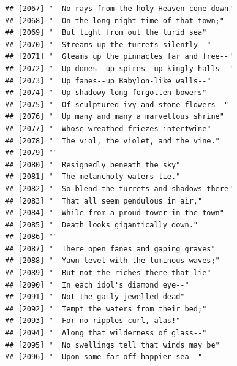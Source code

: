 \documentclass{article}\usepackage[]{graphicx}\usepackage[]{color}
\makeatletter
\newenvironment{kframe}{%
 \def\at@end@of@kframe{}%
 \ifinner\ifhmode%
  \def\at@end@of@kframe{\end{minipage}}%
  \begin{minipage}{\columnwidth}%
 \fi\fi%
 \def\FrameCommand##1{\hskip\@totalleftmargin \hskip-\fboxsep
 \colorbox{shadecolor}{##1}\hskip-\fboxsep
     \hskip-\linewidth \hskip-\@totalleftmargin \hskip\columnwidth}%
 \MakeFramed {\advance\hsize-\width
   \@totalleftmargin\z@ \linewidth\hsize
   \@setminipage}}%
 {\par\unskip\endMakeFramed%
 \at@end@of@kframe}
\newenvironment{knitrout}{}{} %
\makeatother
\begin{document}
\begin{knitrout}
\begin{kframe}
\begin{verbatim}
## [2067] "  No rays from the holy Heaven come down"                                    
## [2068] "  On the long night-time of that town;"                                      
## [2069] "  But light from out the lurid sea"                                          
## [2070] "  Streams up the turrets silently--"                                         
## [2071] "  Gleams up the pinnacles far and free--"                                    
## [2072] "  Up domes--up spires--up kingly halls--"                                    
## [2073] "  Up fanes--up Babylon-like walls--"                                         
## [2074] "  Up shadowy long-forgotten bowers"                                          
## [2075] "  Of sculptured ivy and stone flowers--"                                     
## [2076] "  Up many and many a marvellous shrine"                                      
## [2077] "  Whose wreathed friezes intertwine"                                         
## [2078] "  The viol, the violet, and the vine."                                       
## [2079] ""                                                                            
## [2080] "  Resignedly beneath the sky"                                                
## [2081] "  The melancholy waters lie."                                                
## [2082] "  So blend the turrets and shadows there"                                    
## [2083] "  That all seem pendulous in air,"                                           
## [2084] "  While from a proud tower in the town"                                      
## [2085] "  Death looks gigantically down."                                            
## [2086] ""                                                                            
## [2087] "  There open fanes and gaping graves"                                        
## [2088] "  Yawn level with the luminous waves;"                                       
## [2089] "  But not the riches there that lie"                                         
## [2090] "  In each idol's diamond eye--"                                              
## [2091] "  Not the gaily-jewelled dead"                                               
## [2092] "  Tempt the waters from their bed;"                                          
## [2093] "  For no ripples curl, alas!"                                                
## [2094] "  Along that wilderness of glass--"                                          
## [2095] "  No swellings tell that winds may be"                                       
## [2096] "  Upon some far-off happier sea--"                                           

\end{verbatim}
\end{kframe}
\end{knitrout}
\end{document}
